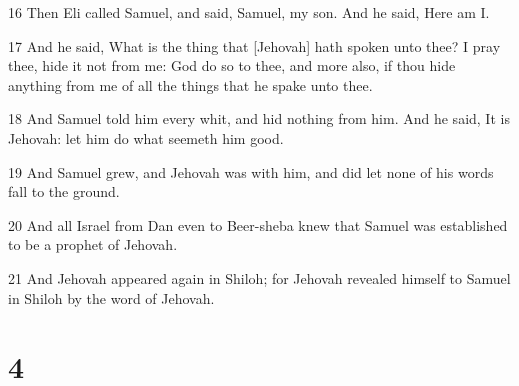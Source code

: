 \par 16 Then Eli called Samuel, and said, Samuel, my son. And he said, Here am I.
\par 17 And he said, What is the thing that [Jehovah] hath spoken unto thee? I pray thee, hide it not from me: God do so to thee, and more also, if thou hide anything from me of all the things that he spake unto thee.
\par 18 And Samuel told him every whit, and hid nothing from him. And he said, It is Jehovah: let him do what seemeth him good.
\par 19 And Samuel grew, and Jehovah was with him, and did let none of his words fall to the ground.
\par 20 And all Israel from Dan even to Beer-sheba knew that Samuel was established to be a prophet of Jehovah.
\par 21 And Jehovah appeared again in Shiloh; for Jehovah revealed himself to Samuel in Shiloh by the word of Jehovah.

\chapter{4}

